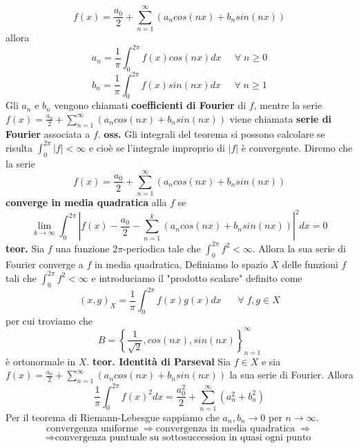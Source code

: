 \[
    f(x) = \frac{a_0}{2} + \sum_{n=1}^{\infty}(a_n cos(nx) + b_n sin(nx))
\]
allora
\[
    a_n = \frac{1}{\pi} \int_{0}^{2\pi} f(x) cos(nx) dx \;\;\;\; \;\forall\;n\geq0
\]
\[
    b_n = \frac{1}{\pi} \int_{0}^{2\pi} f(x) sin(nx) dx \;\;\;\;\;\forall\;n\geq 1
\]
Gli $a_n$ e $b_n$ vengono chiamati \textbf{coefficienti di Fourier} di $f$, mentre la serie $f(x) = \frac{a_0}{2} + \sum_{n=1}^{\infty}(a_n cos(nx) + b_n sin(nx))$ viene chiamata \textbf{serie di Fourier} associata a $f$.\newline
\newline
\textbf{oss.} Gli integrali del teorema si possono calcolare se risulta $\int_{0}^{2\pi}|f| < \infty$ e cioè se l'integrale improprio di $|f|$ è convergente.\newline
\newline
Diremo che la serie 
\[
    f(x) = \frac{a_0}{2} + \sum_{n=1}^{\infty}(a_n cos(nx) + b_n sin(nx))
\]
\textbf{converge in media quadratica} alla $f$ se
\[
    \lim_{k\rightarrow \infty} \int_{0}^{2\pi} \left| f(x) - \frac{a_0}{2} - \sum_{n=1}^{k}\left( a_n cos(nx) + b_n sin(nx) \right) \right|^2 dx = 0
\]
\newline
\textbf{teor.} Sia $f$ una funzione $2\pi$-periodica tale che $\int_{0}^{2\pi}f^2 < \infty$. Allora la sua serie di Fourier converge a $f$ in media quadratica.\newline
\newline
Definiamo lo spazio $X$ delle funzioni $f$ tali che $\int_{0}^{2\pi}f^2 < \infty$ e introduciamo il "prodotto scalare" definito come
\[
    (x,g)_{X} = \frac{1}{\pi}\int_{0}^{2\pi} f(x) g(x) dx \;\;\;\;\; \;\forall\;f,g \in X
\]
per cui troviamo che 
\[
    B = \left\{ \frac{1}{\sqrt{2}}, cos(nx), sin(nx) \right\}_{n=1} ^\infty
\]
è ortonormale in $X$.\newline
\newline
\textbf{teor. Identità di Parseval}\newline
Sia $f \in X$ e sia $f(x) = \frac{a_0}{2} + \sum_{n=1}^{\infty}(a_n cos(nx) + b_n sin(nx))$ la sua serie di Fourier. Allora
\[
    \frac{1}{\pi} \int_{0}^{2\pi} f(x)^2 dx = \frac{a_0^2}{2} + \sum_{n=1}^{\infty}(a_n^2 + b_n^2)
\]
Per il teorema di Riemann-Lebesgue sappiamo che $a_n, b_n \rightarrow  0$ per $n \rightarrow  \infty$.\newline
\newline
\[
\text{convergenza uniforme}\; \Rightarrow \text{convergenza in media quadratica}\; \Rightarrow 
\]
\[
    \Rightarrow  \text{convergenza puntuale su sottosuccession in quasi ogni punto}\;
\]
